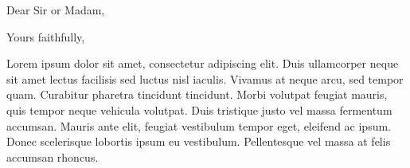 \documentclass[11pt,a4paper,sans]{moderncv}   %
\begin{document}


\renewcommand{\listitemsymbol}{-~}            %


\nocite{*}



\clearpage
\date{January 01, 1984}
\opening{Dear Sir or Madam,}
\closing{Yours faithfully,}
\makelettertitle

Lorem ipsum dolor sit amet, consectetur adipiscing elit. Duis ullamcorper neque sit amet lectus facilisis sed luctus nisl iaculis. Vivamus at neque arcu, sed tempor quam. Curabitur pharetra tincidunt tincidunt. Morbi volutpat feugiat mauris, quis tempor neque vehicula volutpat. Duis tristique justo vel massa fermentum accumsan. Mauris ante elit, feugiat vestibulum tempor eget, eleifend ac ipsum. Donec scelerisque lobortis ipsum eu vestibulum. Pellentesque vel massa at felis accumsan rhoncus.
\end{document}
